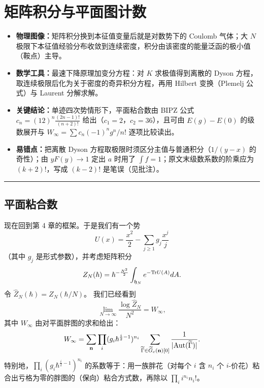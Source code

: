 \section{矩阵积分与平面图计数}

\begin{keytakeaways}
\begin{itemize}
  \item \textbf{物理图像：}矩阵积分换到本征值变量后就是对数势下的 Coulomb 气体；大 $N$ 极限下本征值经验分布收敛到连续密度，积分由该密度的能量泛函的极小值（鞍点）主导。
  \item \textbf{数学工具：}最速下降原理加变分方程：对 $K$ 求极值得到离散的 Dyson 方程，取连续极限后化为关于密度的奇异积分方程，再用 Hilbert 变换（Plemelj 公式）与 Laurent 分解求解。
  \item \textbf{关键结论：}单迹四次势情形下，平面粘合数由 BIPZ 公式 $c_n=(12)^n\frac{(2n-1)!}{(n+2)!}$ 给出（$c_1=2$，$c_2=36$），且可由 $E(g)-E(0)$ 的级数展开与 $W_\infty=\sum c_n(-1)^ng^n/n!$ 逐项比较读出。
  \item \textbf{易错点：}把离散 Dyson 方程取极限时须区分主值与普通积分（$1/(y-x)$ 的奇性）；由 $yF(y)\to 1$ 定出 $a$ 时用了 $\int f=1$；原文末级数系数的阶乘应为 $(k+2)!$，写成 $(k-2)!$ 是笔误（见批注）。
\end{itemize}
\end{keytakeaways}

\bigskip
\noindent\rule{\textwidth}{0.6pt}
\bigskip

\subsection{平面粘合数}

现在回到第 4 章的框架。于是我们有一个势
$$
U(x)=\frac{x^2}{2}-\sum_{j\ge 1}g_j\frac{x^j}{j}
$$
（其中 $g_j$ 是形式参数），并考虑矩阵积分
$$
Z_N(\hbar)=\hbar^{-\frac{N^2}{2}}\int_{{\frak h}_N}e^{-{\rm Tr}U(A)}dA.
$$
令 $\widehat Z_N(\hbar)=Z_N(\hbar/N)$。
我们已经看到
$$
\lim_{N\to \infty}\frac{\log \widehat Z_N}{N^2}=W_\infty, 
$$
其中 $W_\infty$ 由对平面胖图的求和给出：
$$
W_\infty=\sum_{\bold n}\prod_i (g_i\hbar^{\frac{i}{2}-1})^{n_i}\sum_{\widetilde{\Gamma}\in
\widetilde{G}_c(\bold n)[0]}\frac{1}
{|{\rm Aut(\widetilde{\Gamma})}|}.
$$
特别地，$\prod_i (g_i\hbar^{\frac{i}{2}-1})^{n_i}$ 的系数等于：用一族胖花（对每个 $i$ 含 $n_i$ 个 $i$-价花）粘合出亏格为零的胖图的（保向）粘合方式数，再除以 $\prod_i i^{n_i}n_i!$。

